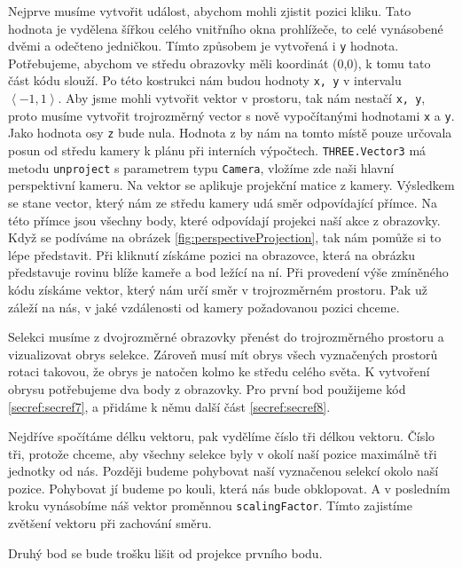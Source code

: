 \documentclass[czech,bachelor,dept420,male,cpdeclaration]{diploma}
\begin{document}
Nejprve musíme vytvořit událost, abychom mohli zjistit pozici kliku. Tato hodnota je vydělena šířkou celého vnitřního okna prohlížeče, to celé vynásobené dvěmi a odečteno jedničkou. Tímto způsobem je vytvořená i \texttt{y} hodnota. Potřebujeme, abychom ve středu obrazovky měli koordinát (0,0), k tomu tato část kódu slouží. Po této kostrukci nám budou hodnoty \texttt{x, y} v intervalu $\left\langle-1,1\right\rangle$. Aby jsme mohli vytvořit vektor v prostoru, tak nám nestačí \texttt{x, y}, proto musíme vytvořit trojrozměrný vector s nově vypočítanými hodnotami \texttt{x} a \texttt{y}. Jako hodnota osy \texttt{z} bude nula. Hodnota z by nám na tomto místě pouze určovala posun od středu kamery k plánu při interních výpočtech. \texttt{THREE.Vector3} má metodu \texttt{unproject} s parametrem typu \texttt{Camera}, vložíme zde naši hlavní perspektivní kameru. Na vektor se aplikuje projekční matice z kamery. Výsledkem se stane vector, který nám ze středu kamery udá směr odpovídající přímce. Na této přímce jsou všechny body, které odpovídají projekci naší akce z obrazovky. Když se podíváme na obrázek \ref{fig:perspectiveProjection}, tak nám pomůže si to lépe představit. Při kliknutí získáme pozici na obrazovce, která na obrázku představuje rovinu blíže kameře a bod ležící na ní. Při provedení výše zmíněného kódu získáme vektor, který nám určí směr v trojrozměrném prostoru. Pak už záleží na nás, v jaké vzdálenosti od kamery požadovanou pozici chceme.

Selekci musíme z dvojrozměrné obrazovky přenést do trojrozměrného prostoru a vizualizovat obrys selekce. Zároveň musí mít obrys všech vyznačených prostorů rotaci takovou, že obrys je natočen kolmo ke středu celého světa. K vytvoření obrysu potřebujeme dva body z obrazovky. Pro první bod použijeme kód \ref{secref:secref7}, a přidáme k němu další část \ref{secref:secref8}.



Nejdříve spočítáme délku vektoru, pak vydělíme číslo tři délkou vektoru. Číslo tři, protože chceme, aby všechny selekce byly v okolí naší pozice maximálně tři jednotky od nás. Později budeme pohybovat naší vyznačenou selekcí okolo naší pozice. Pohybovat jí budeme po kouli, která nás bude obklopovat. A v posledním kroku vynásobíme náš vektor proměnnou \texttt{scalingFactor}. Tímto zajistíme zvětšení vektoru při zachování směru. 

Druhý bod se bude trošku lišit od projekce prvního bodu. 
\end{document}
